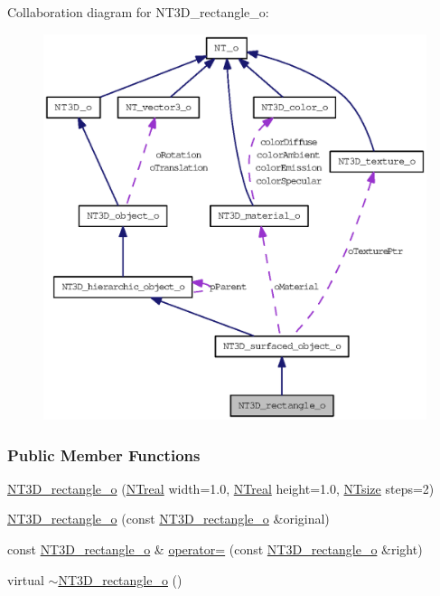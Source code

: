 Collaboration diagram for NT3D\_\-rectangle\_\-o:
\nopagebreak
\begin{figure}[H]
\begin{center}
\leavevmode
\includegraphics[width=400pt]{class_n_t3_d__rectangle__o__coll__graph}
\end{center}
\end{figure}
\subsubsection*{Public Member Functions}
\begin{DoxyCompactItemize}
\item 
\hyperlink{class_n_t3_d__rectangle__o_ad8c63451d4324984afce0bccdb1f2377}{NT3D\_\-rectangle\_\-o} (\hyperlink{nt__types_8h_a814a97893e9deb1eedcc7604529ba80d}{NTreal} width=1.0, \hyperlink{nt__types_8h_a814a97893e9deb1eedcc7604529ba80d}{NTreal} height=1.0, \hyperlink{nt__types_8h_a06c124f2e4469769b58230253ce0560b}{NTsize} steps=2)
\item 
\hyperlink{class_n_t3_d__rectangle__o_a732b7bbdc5c08fb268d06d3a143eb0e8}{NT3D\_\-rectangle\_\-o} (const \hyperlink{class_n_t3_d__rectangle__o}{NT3D\_\-rectangle\_\-o} \&original)
\item 
const \hyperlink{class_n_t3_d__rectangle__o}{NT3D\_\-rectangle\_\-o} \& \hyperlink{class_n_t3_d__rectangle__o_afd76b4f33331fccaf733a954cc662c8f}{operator=} (const \hyperlink{class_n_t3_d__rectangle__o}{NT3D\_\-rectangle\_\-o} \&right)
\item 
virtual \hyperlink{class_n_t3_d__rectangle__o_a65cba09091162587f290fd80ffe78895}{$\sim$NT3D\_\-rectangle\_\-o} ()
\end{DoxyCompactItemize}


